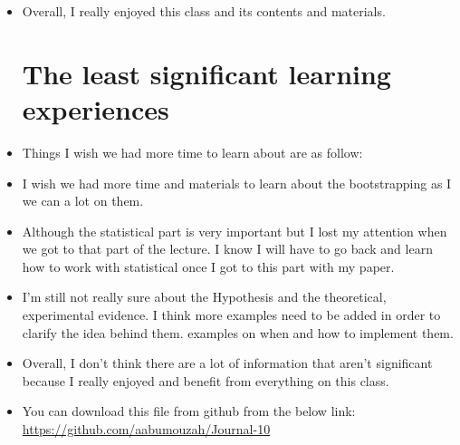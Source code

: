 \documentclass{article}
\begin{document}
\begin{itemize}
    \item Overall, I really enjoyed this class and its contents and materials.
    \section {The least significant learning experiences}
    \item Things I wish we had more time to learn about are as follow:  
    \item I wish we had more time and materials to learn about the bootstrapping as I we can a lot on them. 
    \item Although the statistical part is very important but I lost my attention when we got to that part of the lecture. I know I will have to go back and learn how to work with statistical once I got to this part with my paper.  
    \item I'm still not really sure about the Hypothesis and the theoretical, experimental evidence. I think more examples need to be added in order to clarify the idea behind them. examples on when and how to implement them. 
    \item Overall, I don't think there are a lot of information that aren't significant because I really enjoyed and benefit from everything on this class. 

    
    \item You can download this file from github from the below link: \url{https://github.com/aabumouzah/Journal-10}
\end{itemize}
\end{document}
